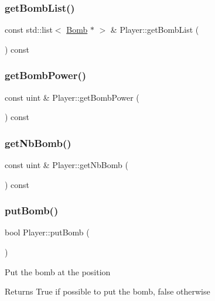 \subsubsection{\texorpdfstring{getBombList()}{getBombList()}}
{\footnotesize\ttfamily const std\+::list$<$ \mbox{\hyperlink{class_bomb}{Bomb}} $\ast$ $>$ \& Player\+::get\+Bomb\+List (\begin{DoxyParamCaption}{ }\end{DoxyParamCaption}) const}

\mbox{\label{class_player_a76422a66b20f1499ea726245632dbbcb}} 
\subsubsection{\texorpdfstring{getBombPower()}{getBombPower()}}
{\footnotesize\ttfamily const uint \& Player\+::get\+Bomb\+Power (\begin{DoxyParamCaption}{ }\end{DoxyParamCaption}) const}

\mbox{\label{class_player_a44887e7850f3c52e4ef95ff8e52c9439}} 
\subsubsection{\texorpdfstring{getNbBomb()}{getNbBomb()}}
{\footnotesize\ttfamily const uint \& Player\+::get\+Nb\+Bomb (\begin{DoxyParamCaption}{ }\end{DoxyParamCaption}) const}

\mbox{\label{class_player_a66e0c55125e2cfb68ceb50dc107ecdb1}} 
\subsubsection{\texorpdfstring{putBomb()}{putBomb()}}
{\footnotesize\ttfamily bool Player\+::put\+Bomb (\begin{DoxyParamCaption}{ }\end{DoxyParamCaption})}

Put the bomb at the position \begin{DoxyReturn}{Returns}
True if possible to put the bomb, false otherwise 
\end{DoxyReturn}
\mbox{\label{class_player_a447b343a103d4d78e298be0201e5fb45}} 
